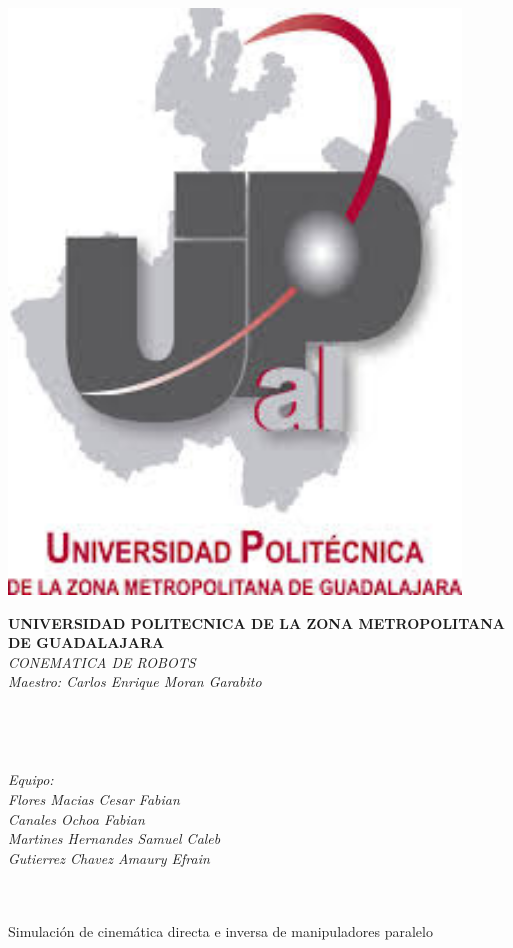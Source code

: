 \documentclass[12pt,a4paper]{article}
\author{Flores Macias Cesar Fabian}
\begin{document}
\begin{center}
\includegraphics[width=12cm]{Imagenes/logo.jpg}  \\
\end{center}
\textbf{UNIVERSIDAD POLITECNICA DE LA ZONA METROPOLITANA DE GUADALAJARA}\\
\textit{CONEMATICA DE ROBOTS}\\
\textit{Maestro: Carlos Enrique Moran Garabito}\\
\\ \\ \\ \\
\textit{Equipo:\\Flores Macias Cesar Fabian \\ Canales Ochoa Fabian\\ Martines Hernandes Samuel Caleb\\Gutierrez Chavez Amaury Efrain}\\
\\ \\ 
\begin{center}
Simulación de cinemática directa e inversa de manipuladores paralelo
\end{center}
\end{document}
